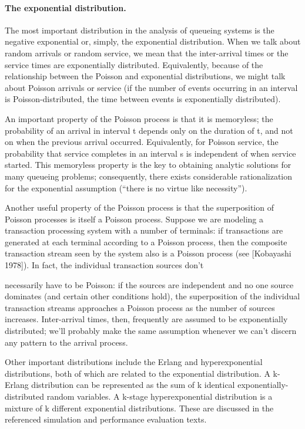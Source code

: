 \paragraph{The exponential distribution.}
The most important distribution in the analysis of queueing systems is the
negative exponential or, simply, the exponential distribution. When we talk
about random arrivals or random service, we mean that the inter-arrival times
or the service times are exponentially distributed. Equivalently, because of
the relationship between the Poisson and exponential distributions, we might
talk about Poisson arrivals or service (if the number of events occurring in an
interval is Poisson-distributed, the time between events is exponentially
distributed).

An important property of the Poisson process is that it is memoryless; the
probability of an arrival in interval t depends only on the duration of t, and
not on when the previous arrival occurred. Equivalently, for Poisson service,
the probability that service completes in an interval s is independent of when
service started. This memoryless property is the key to obtaining analytic
solutions for many queueing problems; consequently, there exists considerable
rationalization for the exponential assumption (``there is no virtue like
necessity'').

Another useful property of the Poisson process is that the superposition of
Poisson processes is itself a Poisson process. Suppose we are modeling a
transaction processing system with a number of terminals: if transactions are
generated at each terminal according to a Poisson process, then the composite
transaction stream seen by the system also is a Poisson process (see
[Kobayashi 1978]). In fact, the individual transaction sources don't

\noindent necessarily have to be Poisson: if the sources are independent and no one
source dominates (and certain other conditions hold), the superposition of the
individual transaction streams approaches a Poisson process as the number of
sources increases. Inter-arrival times, then, frequently are assumed to be
exponentially distributed; we'll probably make the same assumption whenever we
can't discern any pattern to the arrival process.

Other important distributions include the Erlang and hyperexponential
distributions, both of which are related to the exponential distribution. A
k-Erlang distribution can be represented as the sum of k identical
exponentially-distributed random variables. A k-stage hyperexponential
distribution is a mixture of k different exponential distributions. These are
discussed in the referenced simulation and performance evaluation texts.

